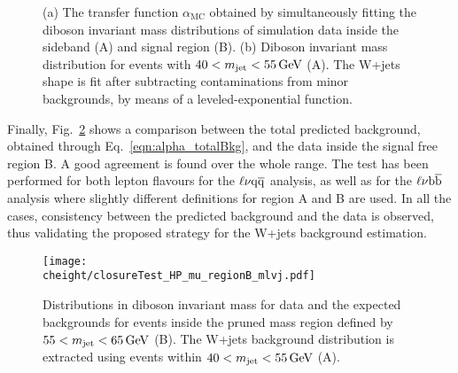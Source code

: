 \begin{figure}[!htb]
\centering
{}
\caption{(a) The transfer function $\alpha_\mathrm{MC}$ obtained by simultaneously fitting the diboson invariant mass distributions of simulation data inside the sideband (A) and signal region (B). (b) Diboson invariant mass distribution for events with $40 < m_{\text{jet}} < 55\,\text{Ge\hspace{-.08em}V}$ (A). The W+jets shape is fit after subtracting contaminations from minor backgrounds, by means of a leveled-exponential function.}
\label{fig:mlvjSBandAlpha_closureTest}
\end{figure}

Finally, Fig.~\ref{fig:mlvjSR_closureTest} shows a comparison between the total predicted background, obtained through Eq.~\ref{eqn:alpha_totalBkg}, and the data inside the signal free region B.
A good agreement is found over the whole \mlvj range.
The test has been performed for both lepton flavours for the $\ell\nu\mathrm{q}\overline{\mathrm{q}}$ analysis, as well as for the $\ell\nu{\mathrm{b}\overline{\mathrm{b}}}$ analysis where slightly different definitions for region A and B are used.
In all the cases, consistency between the predicted background and the data is observed, thus validating the proposed strategy for the W+jets background estimation.

\begin{figure}[!htb]
\centering
\texttt{[image: \\cheight/closureTest\_HP\_mu\_regionB\_mlvj.pdf]}
\caption{Distributions in diboson invariant mass for data and the expected backgrounds for events inside the pruned mass region defined by $55 < m_{\text{jet}} < 65\,\text{Ge\hspace{-.08em}V}$ (B). The W+jets background distribution is extracted using events within $40 < m_{\text{jet}} < 55\,\text{Ge\hspace{-.08em}V}$ (A).}
\label{fig:mlvjSR_closureTest}
\end{figure}

